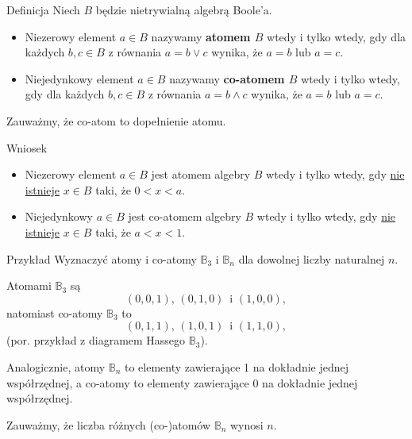 \documentclass[a4paper,10pt]{beamer}
\begin{document}
\begin{frame}
	
	\begin{block}{Definicja}
		Niech $B$ będzie nietrywialną algebrą Boole'a.
		\begin{itemize}
			\item Niezerowy element $a\in B$ nazywamy {\bf atomem $B$} wtedy i tylko wtedy, gdy dla każdych $b,c\in B$ z równania $a=b\vee c$ wynika, że $a=b$ lub $a=c$.
			\item Niejedynkowy element $a\in B$ nazywamy {\bf co-atomem $B$} wtedy i tylko wtedy, gdy dla każdych $b,c\in B$ z równania $a=b\wedge c$ wynika, że $a=b$ lub $a=c$. 
		\end{itemize}
	\end{block}
	Zauważmy, że co-atom to dopełnienie atomu.
	
	\begin{block}{Wniosek}
		\begin{itemize}
			\item Niezerowy element $a\in B$ jest atomem algebry $B$ wtedy i tylko wtedy, gdy \underline{nie istnieje} $x\in B$ taki, że $0<x<a$.
			\item Niejedynkowy $a\in B$ jest co-atomem algebry $B$ wtedy i tylko wtedy, gdy \underline{nie istnieje} $x\in B$ taki, że $a<x<1$.
		\end{itemize}
	\end{block}
	
\end{frame}


\begin{frame}
	
	\begin{exampleblock}{Przykład}
		Wyznaczyć atomy i co-atomy $\mathbb{B}_3$ i $\mathbb{B}_n$ dla dowolnej liczby naturalnej $n$.
		
		Atomami $\mathbb{B}_3$ są $$(0,0,1),\,(0,1,0)\,\mbox{ i }(1,0,0),$$ natomiast co-atomy $\mathbb{B}_3$ to $$(0,1,1),\,(1,0,1)\,\mbox{ i }(1,1,0),$$ (por. przykład z diagramem Hassego $\mathbb{B}_3$).
		
		Analogicznie, atomy $\mathbb{B}_n$ to elementy zawierające 1 na dokładnie jednej współrzędnej, a co-atomy to elementy zawierające 0 na dokładnie jednej współrzędnej.
		
		Zauważmy, że liczba różnych (co-)atomów $\mathbb{B}_n$ wynosi $n$.
	\end{exampleblock}
	
\end{frame}
\end{document}
